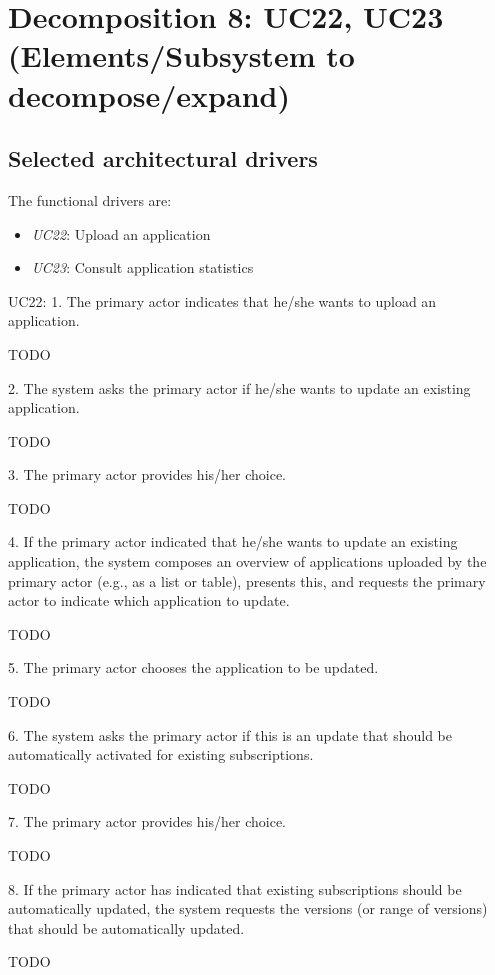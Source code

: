 \section{Decomposition 8: UC22, UC23 (Elements/Subsystem to decompose/expand)}


\subsection{Selected architectural drivers}
    The functional drivers are:
    \begin{itemize}
        \item \emph{UC22}: Upload an application
        \item \emph{UC23}: Consult application statistics
    \end{itemize}

    UC22:
        1. The primary actor indicates that he/she wants to upload an application.

            TODO

        2. The system asks the primary actor if he/she wants to update an existing application.

            TODO

        3. The primary actor provides his/her choice.

            TODO

        4. If the primary actor indicated that he/she wants to update an existing application, the system composes an overview of applications uploaded by the primary actor (e.g., as a list or table), presents this, and requests the primary actor to indicate which application to update.

            TODO

        5. The primary actor chooses the application to be updated.

            TODO

        6. The system asks the primary actor if this is an update that should be automatically activated for existing subscriptions.

            TODO

        7. The primary actor provides his/her choice.

            TODO

        8. If the primary actor has indicated that existing subscriptions should be automatically updated, the system requests the versions (or range of versions) that should be automatically updated.

            TODO

